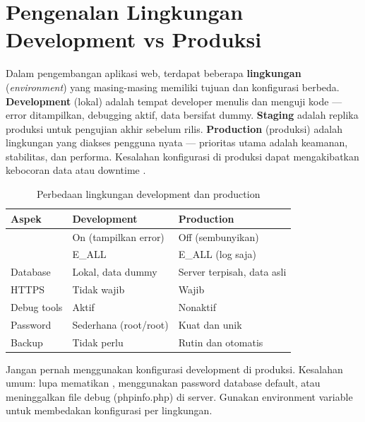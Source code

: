 ﻿\section{Pengenalan Lingkungan Development vs Produksi}

Dalam pengembangan aplikasi web, terdapat beberapa \textbf{lingkungan} (\textit{environment}) yang masing-masing memiliki tujuan dan konfigurasi berbeda. \textbf{Development} (lokal) adalah tempat developer menulis dan menguji kode --- error ditampilkan, debugging aktif, data bersifat dummy. \textbf{Staging} adalah replika produksi untuk pengujian akhir sebelum rilis. \textbf{Production} (produksi) adalah lingkungan yang diakses pengguna nyata --- prioritas utama adalah keamanan, stabilitas, dan performa. Kesalahan konfigurasi di produksi dapat mengakibatkan kebocoran data atau downtime \cite{mdnDeploy}.

\begin{table}[H]
\centering
\begin{tabular}{|P{3cm}|P{4cm}|P{4cm}|}
\hline
\textbf{Aspek} & \textbf{Development} & \textbf{Production} \\
\hline
{} & On (tampilkan error) & Off (sembunyikan) \\
\hline
{} & E\_ALL & E\_ALL (log saja) \\
\hline
Database & Lokal, data dummy & Server terpisah, data asli \\
\hline
HTTPS & Tidak wajib & Wajib \\
\hline
Debug tools & Aktif & Nonaktif \\
\hline
Password & Sederhana (root/root) & Kuat dan unik \\
\hline
Backup & Tidak perlu & Rutin dan otomatis \\
\hline
\end{tabular}
\caption{Perbedaan lingkungan development dan production}
\end{table}

\begin{catatan}
Jangan pernah menggunakan konfigurasi development di produksi. Kesalahan umum: lupa mematikan , menggunakan password database default, atau meninggalkan file debug (phpinfo.php) di server. Gunakan environment variable untuk membedakan konfigurasi per lingkungan.
\end{catatan}

